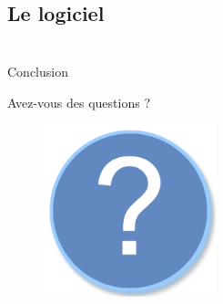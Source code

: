 \documentclass{beamer}
\begin{document}
		\subsection{Le logiciel}
		\begin{frame}
			\end{frame}

			\section{} %
			\begin{frame}{Conclusion}

				\end{frame}

				\begin{frame}{Avez-vous des questions ?}
					\begin{figure}[H]
						\centering
						\includegraphics[width=5cm]{interrogation.png}
					\end{figure}
				\end{frame}
				\begin{frame}
					\titlepage
				\end{frame}
				
\end{document}
